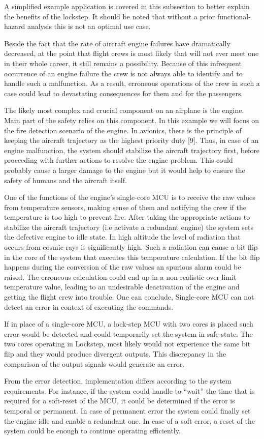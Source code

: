 A simplified example application is covered in this subsection to better explain the benefits of the lockstep. It should be noted that without a prior functional-hazard analysis this is not an optimal use case.

Beside the fact that the rate of aircraft engine failures have dramatically decreased,
at the point that flight crews is most likely that will not ever meet one in their
whole career, it still remains a possibility. Because of this infrequent occurrence
of an engine failure the crew is not always able to identify and to handle such a
malfunction. As a result, erroneous operations of the crew in such a case could
lead to devastating consequences for them and for the passengers.

The likely most complex and crucial component on an airplane is the engine. Main part of the safety relies on this component. In this example we will focus on the fire detection scenario of the engine. 
In avionics, there is the principle of keeping the aircraft trajectory as
the highest priority duty [9]. Thus, in case of an engine malfunction, the system
should stabilize the aircraft trajectory first, before proceeding with further actions
to resolve the engine problem. This could probably cause a larger damage to the
engine but it would help to ensure the safety of humans and the aircraft itself.

One of the functions of the engine's single-core MCU is to receive the raw values from temperature sensors, making sense of them and notifying the crew if the temperature is too high to prevent fire.  
After taking the appropriate actions to stabilize the aircraft trajectory (i.e activate a redundant engine) the system sets the defective engine to idle state. In high
altitude the level of radiation that occurs from cosmic rays is significantly high.
Such a radiation can cause a bit flip in the core of the
system that executes this temperature calculation. If the bit flip happens during the conversion of the raw values an spurious alarm could be raised. The erroneous calculation could end up in a non-realistic
over-limit temperature value, leading to an undesirable deactivation of the engine
and getting the flight crew into trouble. One can conclude, Single-core MCU can not detect an error in context of executing the commands.

If in place of a single-core MCU, a lock-step MCU with two cores is placed such error would be detected and could temporarily set the system in safe-state. The
two cores operating in Lockstep, most likely would not experience the same bit flip
and they would produce divergent outputs. This discrepancy in the comparison of
the output signals would generate an error.


From the error detection, implementation differs according to the system requirements. For instance, if the system could handle to “wait” the time that is required for a
soft-reset of the MCU, it could be determined if the error is temporal or permanent.
In case of permanent error the system could finally set the engine idle and enable
a redundant one. In case of a soft error, a reset of the system could be enough to
continue operating efficiently.

